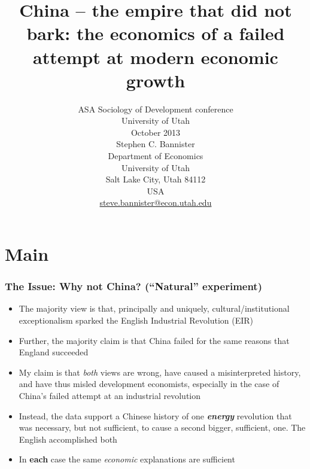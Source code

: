 \documentclass[final]{beamer}
\title{China -- the empire that did not bark: the economics of a failed attempt at modern economic growth}
\author{ASA Sociology of Development conference\\University of Utah\\October 2013 
\newline
	\\Stephen C. Bannister\\
	Department of Economics\\
	University of Utah\\
	Salt Lake City, Utah 84112\\
	USA\\
	\href{mailto:steve.bannister@econ.utah.edu}{steve.bannister@econ.utah.edu}\\
	}
\date{}
\begin{document}

	\maketitle
	\nocite{*}
%	

	
%	


\section{Main}

\begin{frame}
\frametitle{The Issue: Why not China? (``Natural'' experiment)}\pause
\begin{itemize}
\item The majority view is that, principally and uniquely, cultural/institutional exceptionalism sparked the English Industrial Revolution (EIR)\\ \pause 
\item Further, the majority claim is that China failed for the same reasons that England succeeded\\ \pause
\item My claim is that \textit{both} views are wrong, have caused a misinterpreted history, and have thus misled development economists, especially in the case of China's failed attempt at an industrial revolution\\ \pause
\item Instead, the data support a Chinese history of one \textbf{\textit{energy}} revolution that was necessary, but not sufficient, to cause a second bigger, sufficient, one. The English accomplished both\\ \pause 
\item In \textbf{each} case the same \textit{economic} explanations are sufficient\\
\end{itemize}
\end{frame}
\end{document}
